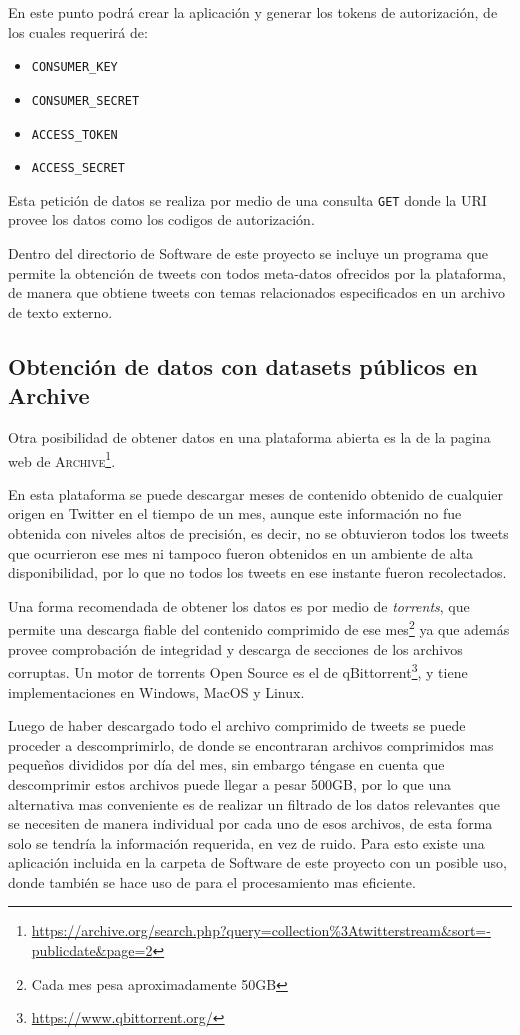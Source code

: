 En este punto podrá crear la aplicación y generar los tokens de autorización, de los cuales requerirá de:
\begin{itemize}
\item \texttt{CONSUMER\_KEY}
\item \texttt{CONSUMER\_SECRET}
\item \texttt{ACCESS\_TOKEN}
\item \texttt{ACCESS\_SECRET}
\end{itemize}

Esta petición de datos se realiza por medio de una consulta \texttt{GET} donde la URI provee los datos como los codigos de autorización.

Dentro del directorio de Software de este proyecto se incluye un programa que permite la obtención de tweets con todos meta-datos ofrecidos por la plataforma, de manera que obtiene tweets con temas relacionados especificados en un archivo de texto externo.

\subsection{Obtención de datos con datasets públicos en Archive}
Otra posibilidad de obtener datos en una plataforma abierta es la de la pagina web de \textsc{Archive}\footnote{\href{https://archive.org/search.php?query=collection\%3Atwitterstream\&sort=-publicdate\&page=2}{https://archive.org/search.php?query=collection\%3Atwitterstream\&sort=-publicdate\&page=2}}.

En esta plataforma se puede descargar meses de contenido obtenido de cualquier origen en Twitter en el tiempo de un mes, aunque este información no fue obtenida con niveles altos de precisión, es decir, no se obtuvieron todos los tweets que ocurrieron ese mes ni tampoco fueron obtenidos en un ambiente de alta disponibilidad, por lo que no todos los tweets en ese instante fueron recolectados.

Una forma recomendada de obtener los datos es por medio de \emph{torrents}, que permite una descarga fiable del contenido comprimido de ese mes\footnote{Cada mes pesa aproximadamente 50GB} ya que además provee comprobación de integridad y descarga de secciones de los archivos corruptas. Un motor de torrents Open Source es el de qBittorrent\footnote{\href{https://www.qbittorrent.org/}{https://www.qbittorrent.org/}}, y tiene implementaciones en Windows, MacOS y Linux.

Luego de haber descargado todo el archivo comprimido de tweets se puede proceder a descomprimirlo, de donde se encontraran archivos comprimidos mas pequeños divididos por día del mes, sin embargo téngase en cuenta que descomprimir estos archivos puede llegar a pesar 500GB, por lo que una alternativa mas conveniente es de realizar un filtrado de los datos relevantes que se necesiten de manera individual por cada uno de esos archivos, de esta forma solo se tendría la información requerida, en vez de ruido. Para esto existe una aplicación incluida en la carpeta de Software de este proyecto con un posible uso, donde también se hace uso de \cite{Tange2011a} para el procesamiento mas eficiente.

